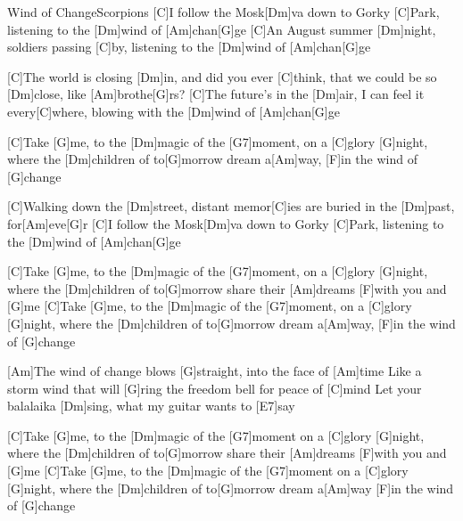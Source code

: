 \documentclass[../main.tex]{subfiles}
\begin{document}
\begin{song}{Wind of Change}{Scorpions}{}
[C]I follow the Mosk[Dm]va down to Gorky [C]Park, listening to the [Dm]wind of [Am]chan[G]ge
[C]An August summer [Dm]night, soldiers passing [C]by, listening to the [Dm]wind of [Am]chan[G]ge

[C]The world is closing [Dm]in, and did you ever [C]think, that we could be so [Dm]close, like [Am]brothe[G]rs?
[C]The future's in the [Dm]air, I can feel it every[C]where, blowing with the [Dm]wind of [Am]chan[G]ge

[C]Take [G]me, to the [Dm]magic of the [G7]moment, on a [C]glory [G]night,
where the [Dm]children of to[G]morrow dream a[Am]way, [F]in the wind of [G]change

[C]Walking down the [Dm]street, distant memor[C]ies are buried in the [Dm]past, for[Am]eve[G]r
[C]I follow the Mosk[Dm]va down to Gorky [C]Park, listening to the [Dm]wind of [Am]chan[G]ge

[C]Take [G]me, to the [Dm]magic of the [G7]moment, on a [C]glory [G]night,
where the [Dm]children of to[G]morrow share their [Am]dreams [F]with you and [G]me
[C]Take [G]me, to the [Dm]magic of the [G7]moment, on a [C]glory [G]night,
where the [Dm]children of to[G]morrow dream a[Am]way, [F]in the wind of [G]change

[Am]The wind of change blows [G]straight, into the face of [Am]time
Like a storm wind that will [G]ring the freedom bell for peace of [C]mind
Let your balalaika [Dm]sing, what my guitar wants to [E7]say

[C]Take [G]me, to the [Dm]magic of the [G7]moment on a [C]glory [G]night,
where the [Dm]children of to[G]morrow share their [Am]dreams [F]with you and [G]me
[C]Take [G]me, to the [Dm]magic of the [G7]moment on a [C]glory [G]night,
where the [Dm]children of to[G]morrow dream a[Am]way [F]in the wind of [G]change

\end{song}
\end{document}

